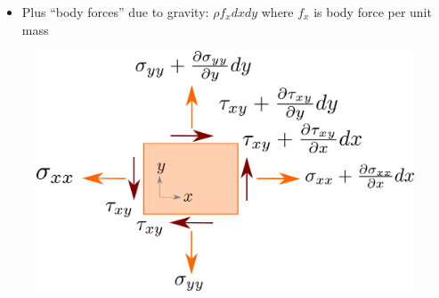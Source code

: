 \documentclass[notes]{beamer}
\begin{document}
\begin{frame}
{\begin{minipage}[t]{0.48\linewidth}
\begin{itemize}
		\item Plus ``body forces'' due to gravity: $\rho f_x dx dy$ where $f_x$ is body force per unit mass
	\end{itemize}
 \end{minipage}%
 \hfill%
 \begin{minipage}[t]{0.48\linewidth}
 	\begin{figure}
 		\includegraphics[width=\linewidth]{figs/equilibrium-finished.pdf}
 	\end{figure}
 \end{minipage}
}
\end{frame}
\end{document}
